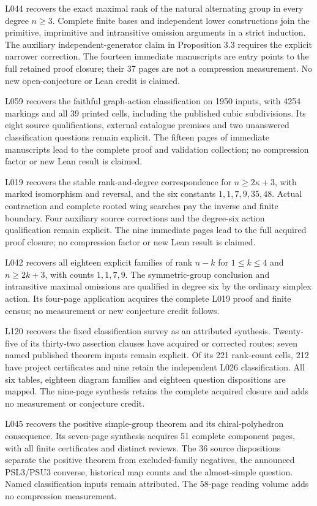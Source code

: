 \documentclass[11pt,a4paper]{article}
\begin{document}
L044 recovers the exact maximal rank of the natural alternating group in
every degree $n\geq3$. Complete finite bases and independent lower constructions
join the primitive, imprimitive and intransitive omission arguments in a
strict induction. The auxiliary independent-generator claim in Proposition 3.3
requires the explicit narrower correction. The fourteen immediate manuscripts
are entry points to the full retained proof closure; their 37 pages are not
a compression measurement. No new open-conjecture or Lean credit is claimed.

L059 recovers the faithful graph-action classification on 1950 inputs, with
4254 markings and all 39 printed cells, including the published cubic
subdivisions. Its eight source qualifications, external catalogue premises
and two unanswered classification questions remain explicit. The fifteen
pages of immediate manuscripts lead to the complete proof and validation
collection; no compression factor or new Lean result is claimed.

L019 recovers the stable rank-and-degree correspondence for $n\geq2\kappa+3$,
with marked isomorphism and reversal, and the six constants $1,1,7,9,35,48$.
Actual contraction and complete rooted wing searches pay the inverse and finite
boundary. Four auxiliary source corrections and the degree-six action
qualification remain explicit. The nine immediate pages lead to the full
acquired proof closure; no compression factor or new Lean result is claimed.

L042 recovers all eighteen explicit families of rank $n-k$ for
$1\leq k\leq4$ and $n\geq2k+3$, with counts $1,1,7,9$. The symmetric-group
conclusion and intransitive maximal omissions are qualified in degree six
by the ordinary simplex action. Its four-page application acquires the
complete L019 proof and finite census; no measurement or new conjecture
credit follows.

L120 recovers the fixed classification survey as an attributed synthesis.
Twenty-five of its thirty-two assertion clauses have acquired or corrected
routes; seven named published theorem inputs remain explicit. Of its 221
rank-count cells, 212 have project certificates and nine retain the independent
L026 classification. All six tables, eighteen diagram families and eighteen
question dispositions are mapped. The nine-page synthesis retains the complete
acquired closure and adds no measurement or conjecture credit.

L045 recovers the positive simple-group theorem and its chiral-polyhedron
consequence. Its seven-page synthesis acquires 51 complete component pages,
with all finite certificates and distinct reviews. The 36 source dispositions
separate the positive theorem from excluded-family negatives, the announced
PSL3/PSU3 converse, historical map counts and the almost-simple question.
Named classification inputs remain attributed. The 58-page reading volume
adds no compression measurement.
\end{document}

